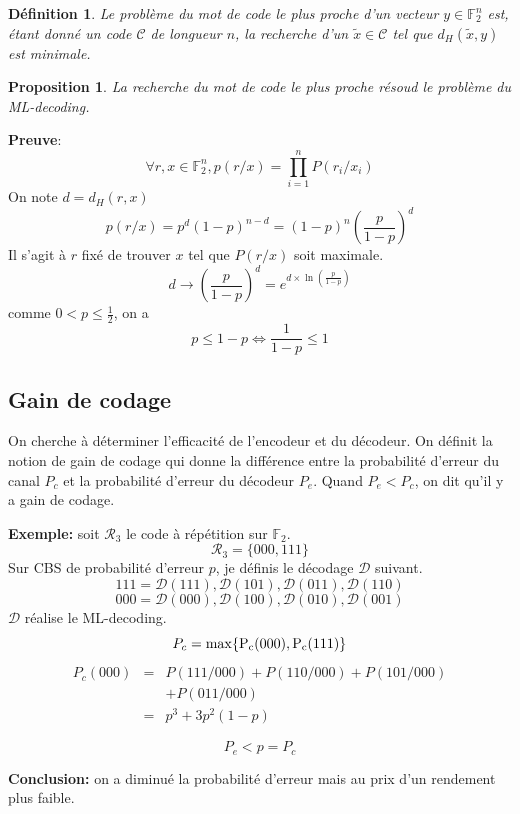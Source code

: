 \documentclass[a4paper,10pt,twocolumn]{article}
\theoremstyle{break}
\newtheorem{mydef}{Définition}
\newtheorem{myprop}{Proposition}
\newenvironment{note}[1]
{\textbf{#1}:}
{}
\newenvironment{myproof}
{\begin{note}{Preuve}}
{\end{note}}
\begin{document}
 
\begin{mydef}
 Le problème du mot de code le plus proche d'un vecteur $y \in \mathbb{F}_2^n$ est, étant donné un code $\mathcal{C}$ de longueur $n$, la recherche d'un $\tilde{x} \in \mathcal{C}$ tel que $d_H(\tilde{x}, y)$ est minimale.
\end{mydef}

\begin{myprop}
 La recherche du mot de code le plus proche résoud le problème du ML-decoding.
\end{myprop}

\begin{myproof}
 $$ \forall r,x \in \mathbb{F}_2^n, p(r/x) = \prod_{i=1}^n P(r_i/x_i) $$
 On note $d = d_H(r,x)$
 $$p(r/x) = p^d(1-p)^{n-d} = (1-p)^n \left(\frac{p}{1-p}\right)^d$$
 Il s'agit à $r$ fixé de trouver $x$ tel que $P(r/x)$ soit maximale.
 $$d \rightarrow \left(\frac{p}{1-p}\right)^d = e^{d\times\ln(\frac{p}{1-p})} $$
 comme $0 < p \le \frac{1}{2}$, on a 
 $$p \le 1 - p \Leftrightarrow \frac{1}{1-p} \le 1 $$
\end{myproof}

\subsection{Gain de codage}
On cherche à déterminer l'efficacité de l'encodeur et du décodeur. On définit la notion de gain de codage qui donne la différence entre la probabilité d'erreur du canal $P_c$ et la probabilité d'erreur du décodeur $P_e$. Quand $P_e < P_c$, on dit qu'il y a gain de codage.

\textbf{Exemple:} soit $\mathcal{R}_3$ le code à répétition sur $\mathbb{F}_2$.
$$ \mathcal{R}_3 = \lbrace 000, 111 \rbrace $$
Sur CBS de probabilité d'erreur $p$, je définis le décodage $\mathcal{D}$ suivant.
$$ 111 = \mathcal{D}(111), \mathcal{D}(101), \mathcal{D}(011), \mathcal{D}(110) $$
$$ 000 = \mathcal{D}(000), \mathcal{D}(100), \mathcal{D}(010), \mathcal{D}(001) $$
$\mathcal{D}$ réalise le ML-decoding.
$$ P_c = \rm{max}\lbrace P_c(000), P_c(111) \rbrace $$
\begin{eqnarray*}
 P_c(000) & = & P(111/000) + P(110/000) + P(101/000) \\
 & &  + P(011/000)\\
 & = & p^3 + 3p^2 (1-p)
\end{eqnarray*}

$$ P_e < p = P_c $$

\textbf{Conclusion:} on a diminué la probabilité d'erreur mais au prix d'un rendement plus faible.
\end{document}

